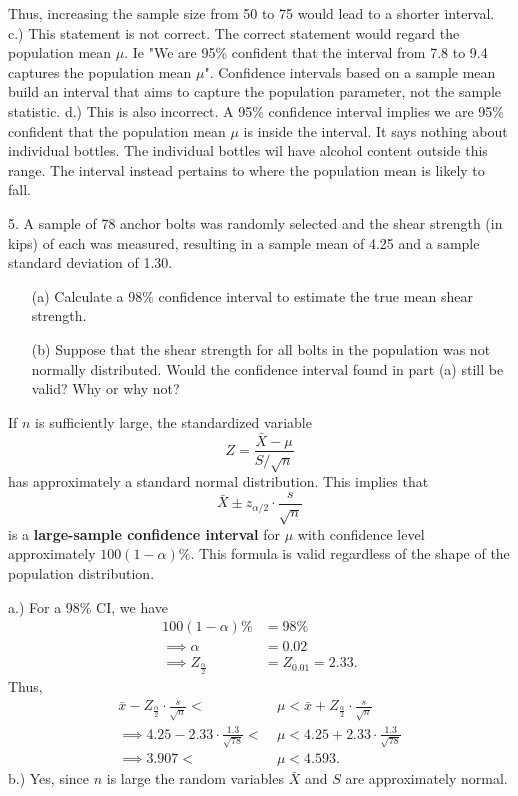 \documentclass{report}
\begin{document}
\bigbreak \noindent 
Thus, increasing the sample size from 50 to 75 would lead to a shorter interval.
\bigbreak \noindent 
c.) This statement is not correct. The correct statement would regard the population mean $\mu$. Ie "We are 95\% confident that the interval from 7.8 to 9.4 captures the population mean $\mu$". Confidence intervals based on a sample mean build an interval that aims to capture the population parameter, not the sample statistic.
\bigbreak \noindent 
d.) This is also incorrect. A 95\% confidence interval implies we are 95\% confident that the population mean $\mu$ is inside the interval. It says nothing about individual bottles. The individual bottles wil have alcohol content outside this range. The interval instead pertains to where the population mean is likely to fall.

\pagebreak \bigbreak \noindent 
\begin{mdframed}
5. A sample of 78 anchor bolts was randomly selected and the shear strength (in kips) of each was measured, resulting in a sample mean of 4.25 and a sample standard deviation of 1.30.
\begin{itemize}
    \item[(a)] Calculate a 98\% confidence interval to estimate the true mean shear strength.
    \item[(b)] Suppose that the shear strength for all bolts in the population was not normally distributed. Would the confidence interval found in part (a) still be valid? Why or why not?
\end{itemize}
\end{mdframed}
\bigbreak \noindent 
\begin{remark}
    If \( n \) is sufficiently large, the standardized variable
    \[
        Z = \frac{\bar{X} - \mu}{S/\sqrt{n}}
    \]
    has approximately a standard normal distribution. This implies that
    \[
        \bar{X} \pm z_{\alpha/2} \cdot \frac{s}{\sqrt{n}}
    \]
    is a \textbf{large-sample confidence interval} for \( \mu \) with confidence level approximately \( 100(1 - \alpha)\% \). This formula is valid regardless of the shape of the population distribution.
    \smiley{} 
\end{remark}
\bigbreak \noindent 
a.) For a 98\% CI, we have
\begin{align*}
    100(1-\alpha)\% &= 98\% \\
    \implies \alpha &= 0.02 \\
    \implies Z_{\frac{\alpha}{2}} &= Z_{0.01} = 2.33
.\end{align*}
\bigbreak \noindent 
Thus,
\begin{align*}
    \bar{x} - Z_{\frac{\alpha}{2}} \cdot \frac{s}{\sqrt{n}} <\ &\mu < \bar{x} + Z_{\frac{\alpha}{2}} \cdot \frac{s}{\sqrt{n}} \\
    \implies4.25 - 2.33 \cdot \frac{1.3}{\sqrt{78}} <\ &\mu < 4.25 + 2.33 \cdot \frac{1.3}{\sqrt{78}} \\
    \implies 3.907 <\ &\mu < 4.593
.\end{align*}
\bigbreak \noindent 
b.) Yes, since $n$ is large the random variables $\bar{X}$ and $S$ are approximately normal.
\end{document}

